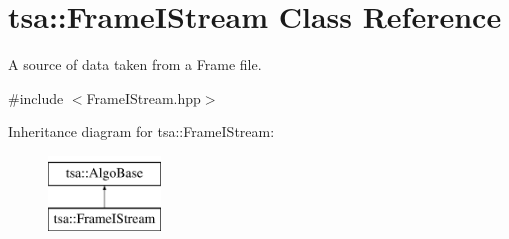 \hypertarget{classtsa_1_1_frame_i_stream}{}\section{tsa\+:\+:Frame\+I\+Stream Class Reference}
\label{classtsa_1_1_frame_i_stream}


A source of data taken from a Frame file.  




{\ttfamily \#include $<$Frame\+I\+Stream.\+hpp$>$}

Inheritance diagram for tsa\+:\+:Frame\+I\+Stream\+:\begin{figure}[H]
\begin{center}
\leavevmode
\includegraphics[height=2.000000cm]{classtsa_1_1_frame_i_stream}
\end{center}
\end{figure}

